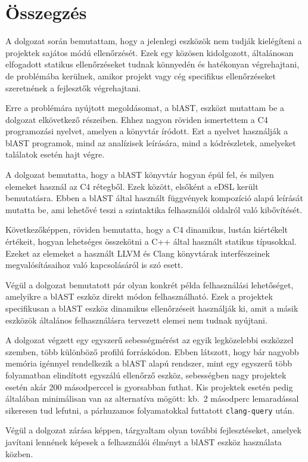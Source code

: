 \chapter*{Összegzés}

A dolgozat során bemutattam, hogy a jelenlegi eszközök nem tudják kielégíteni a projektek sajátos módú ellenőrzését.
Ezek egy közösen kidolgozott, általánosan elfogadott statikus ellenőrzéseket tudnak könnyedén és hatékonyan végrehajtani, de problémába kerülnek, amikor projekt vagy cég specifikus ellenőrzéseket szeretnének a fejlesztők végrehajtani.

Erre a problémára nyújtott megoldásomat, a blAST, eszközt mutattam be a dolgozat elkövetkező részeiben.
Ehhez nagyon röviden ismertettem a C4 programozási nyelvet, amelyen a könyvtár íródott.
Ezt a nyelvet használják a blAST programok, mind az analízisek leírására, mind a kódrészletek, amelyeket találatok esetén hajt végre.

A dolgozat bemutatta, hogy a blAST könyvtár hogyan épül fel, és milyen elemeket használ az C4 rétegből.
Ezek között, elsőként a \gls{eDSL} került bemutatásra.
Ebben a blAST által használt függvények kompozíció alapú leírását mutatta be, ami lehetővé teszi a szintaktika felhasználói oldalról való kibővítését.

Következőképpen, röviden bemutatta, hogy a C4 dinamikus, lustán kiértékelt értékeit, hogyan lehetséges összekötni a C++ által használt statikus típusokkal.
Ezeket az elemeket a használt LLVM és Clang könyvtárak interfészeinek megvalósításaihoz való kapcsolásáról is szó esett.

Végül a dolgozat bemutatott pár olyan konkrét példa felhasználási lehetőséget, amelyikre a blAST eszköz direkt módon felhasználható.
Ezek a projektek specifikusan a blAST eszköz dinamikus ellenőrzéseit használják ki, amit a másik eszközök általános felhasználásra tervezett elemei nem tudnak nyújtani.

A dolgozat végzett egy egyszerű sebességmérést az egyik legközelebbi eszközzel szemben, több különböző profilú forráskódon.
Ebben látszott, hogy bár nagyobb memória igénnyel rendelkezik a blAST alapú rendszer, mint egy egyszerű több folyamatban elindított egyszálú ellenőrző eszköz, sebességben nagy projektek esetén akár 200 másodperccel is gyorsabban futhat.
Kis projektek esetén pedig általában minimálisan van az alternatíva mögött: kb.~2 másodperc lemaradással sikeresen tud lefutni, a párhuzamos folyamatokkal futtatott {\tt clang-query} után.

Végül a dolgozat zárása képpen, tárgyaltam olyan további fejlesztéseket, amelyek javítani lennének képesek a felhasználói élményt a blAST eszköz használata közben.

